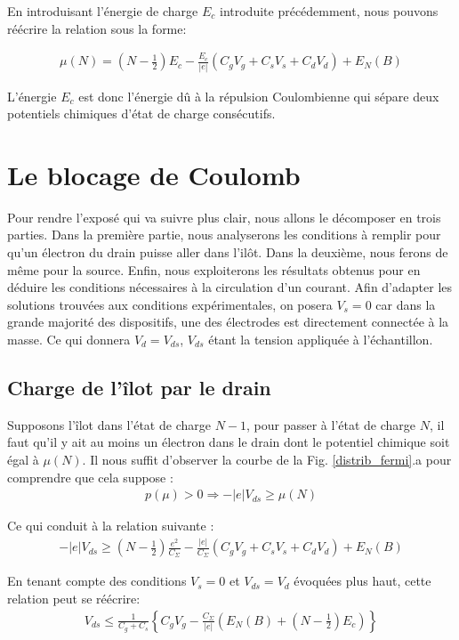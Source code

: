 En introduisant l'énergie de charge $E_c$ introduite précédemment, nous pouvons réécrire la relation sous la forme:

\begin{eqnarray}
\mu(N) = (N-\frac{1}{2})E_c
- 
\frac{E_c}{|e|}(C_gV_g + C_sV_s + C_dV_d)
+
E_N(B)
\label{pot_chim}
\end{eqnarray}

L'énergie $E_c$ est donc l'énergie d\^u à la répulsion Coulombienne qui sépare deux potentiels chimiques d'état de charge consécutifs.


\section{Le blocage de Coulomb}
Pour rendre l'exposé qui va suivre plus clair, nous allons le décomposer en trois parties. Dans la première partie, nous analyserons les conditions à remplir pour qu'un électron du drain puisse aller dans l'il\^ot. Dans la deuxième, nous ferons de m\^eme pour la source. Enfin, nous exploiterons les résultats obtenus pour en déduire les conditions nécessaires à la circulation d'un courant. Afin d'adapter les solutions trouvées aux conditions expérimentales, on posera $V_s = 0$ car dans la grande majorité des dispositifs, une des électrodes est directement connectée à la masse. Ce qui donnera $V_d=V_{ds}$, $V_{ds}$ étant la tension appliquée à l'échantillon.

\subsection{Charge de l'\^ilot par le drain}
Supposons l'\^ilot dans l'état de charge $N-1$, pour passer à l'état de charge $N$, il faut qu'il y ait au moins un électron dans le drain dont le potentiel chimique soit égal à $\mu(N)$. Il nous suffit d'observer la courbe de la Fig. \ref{distrib_fermi}.a pour comprendre que cela suppose :
\begin{eqnarray}
p(\mu) > 0 \Longrightarrow  -|e|V_{ds} \geq \mu(N) \nonumber
\end{eqnarray}

Ce qui conduit à la relation suivante :
\begin{eqnarray}
-|e|V_{ds} \geq (N-\frac{1}{2})\frac{e^2}{C_{\Sigma}}
-
\frac{|e|}{C_{\Sigma}}(C_gV_g + C_sV_s + C_dV_d)
+
E_N(B) \nonumber
\end{eqnarray}

En tenant compte des conditions $V_s= 0$ et $V_{ds} = V_d$ évoquées plus haut, cette relation peut se réécrire:
\begin{eqnarray}
V_{ds} \leq \frac{1}{C_g + C_s} \left\lbrace C_gV_g - \frac{C_{\Sigma}}{|e|}\left(E_N(B) + (N-\frac{1}{2})E_c \right) \right\rbrace 
\end{eqnarray}


